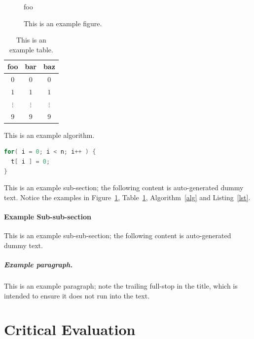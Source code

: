\documentclass[ %
                    author={Carlos Duran Calle},
                supervisor={Dr. Felipe Campelo},
                    degree={MSc},
                     title={Comparative Machine Learning Analysis for Student Dropout Prediction in a Virtual Learning Environment},
                  subtitle={Incorporating Student Engagement and Socio-Economic Features},
                      type={},
                      year={2025}]{dissertation}
\begin{document}
\begin{figure}[h]
\centering
foo
\caption{This is an example figure.}
\label{fig}
\end{figure}

\begin{table}[h]
\centering
\begin{tabular}{|cc|c|}
\hline
foo      & bar      & baz      \\
\hline
$0     $ & $0     $ & $0     $ \\
$1     $ & $1     $ & $1     $ \\
$\vdots$ & $\vdots$ & $\vdots$ \\
$9     $ & $9     $ & $9     $ \\
\hline
\end{tabular}
\caption{This is an example table.}
\label{tab}
\end{table}

\begin{algorithm}[h]
\caption{This is an example algorithm.}
\label{alg}
\end{algorithm}

\begin{lstlisting}[float={t},caption={This is an example listing.},label={lst},language=C]
for( i = 0; i < n; i++ ) {
  t[ i ] = 0;
}
\end{lstlisting}

This is an example sub-section;
the following content is auto-generated dummy text.
Notice the examples in Figure~\ref{fig}, Table~\ref{tab}, Algorithm~\ref{alg}
and Listing~\ref{lst}.

\subsubsection{Example Sub-sub-section}

This is an example sub-sub-section;
the following content is auto-generated dummy text.

\paragraph{Example paragraph.}

This is an example paragraph; note the trailing full-stop in the title,
which is intended to ensure it does not run into the text.


\chapter{Critical Evaluation}
\label{chap:evaluation}
\end{document}
